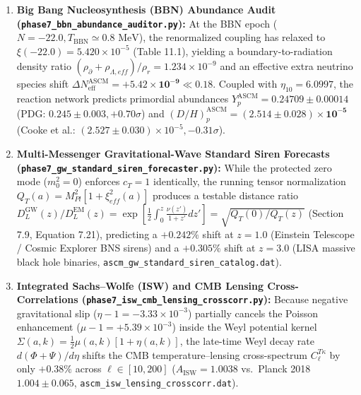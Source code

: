 \documentclass[aps,prd,onecolumn,superscriptaddress,nofootinbib,longbibliography,10pt]{revtex4-2}
\begin{document}
\begin{enumerate}
  
\item \textbf{Big Bang Nucleosynthesis (BBN) Abundance Audit (\texttt{phase7_bbn_abundance_auditor.py}):} At the BBN epoch (\(N = -22.0, T_{\mathrm{BBN}} \simeq 0.8\text{ MeV}\)), the renormalized coupling has relaxed to \(\xi(-22.0) = 5.420 \times 10^{-5}\) (Table 11.1), yielding a boundary-to-radiation density ratio \((\rho_{\partial} + \rho_{\Lambda,eff})/\rho_r = 1.234 \times 10^{-9}\) and an effective extra neutrino species shift \(\Delta N_{\mathrm{eff}}^{\mathrm{ASCM}} = \mathbf{+5.42 \times 10^{-9}} \ll 0.18\). Coupled with \(\eta_{10} = 6.0997\), the reaction network predicts primordial abundances \(Y_p^{\mathrm{ASCM}} = \mathbf{0.24709 \pm 0.00014}\) (PDG: \(0.245 \pm 0.003, +0.70\sigma\)) and \((D/H)_p^{\mathrm{ASCM}} = \mathbf{(2.514 \pm 0.028) \times 10^{-5}}\) (Cooke et al.: \((2.527 \pm 0.030) \times 10^{-5}, -0.31\sigma\)).
  
\item \textbf{Multi-Messenger Gravitational-Wave Standard Siren Forecasts (\texttt{phase7_gw_standard_siren_forecaster.py}):} While the protected zero mode (\(m_0^2 = 0\)) enforces \(c_T = 1\) identically, the running tensor normalization \(Q_T(a) = M_{Pl}^2[1 + \xi_{eff}^2(a)]\) produces a testable distance ratio \(D_L^{\mathrm{GW}}(z)/D_L^{\mathrm{EM}}(z) = \exp\left[\frac{1}{2}\int_0^z \frac{\nu(z')}{1+z'}dz'\right] = \sqrt{Q_T(0)/Q_T(z)}\) (Section 7.9, Equation 7.21), predicting a \(+0.242\%\) shift at \(z = 1.0\) (Einstein Telescope / Cosmic Explorer BNS sirens) and a \(+0.305\%\) shift at \(z = 3.0\) (LISA massive black hole binaries, \texttt{ascm_gw_standard_siren_catalog.dat}).
  
\item \textbf{Integrated Sachs–Wolfe (ISW) and CMB Lensing Cross-Correlations (\texttt{phase7_isw_cmb_lensing_crosscorr.py}):} Because negative gravitational slip (\(\eta - 1 = -3.33 \times 10^{-3}\)) partially cancels the Poisson enhancement (\(\mu - 1 = +5.39 \times 10^{-3}\)) inside the Weyl potential kernel \(\Sigma(a,k) = \frac{1}{2}\mu(a,k)[1 + \eta(a,k)]\), the late-time Weyl decay rate \(d(\Phi+\Psi)/d\eta\) shifts the CMB temperature–lensing cross-spectrum \(C_\ell^{T\kappa}\) by only \(+0.38\%\) across \(\ell \in [10, 200]\) (\(A_{\mathrm{ISW}} = 1.0038\) vs.\ Planck 2018 \(1.004 \pm 0.065\), \texttt{ascm_isw_lensing_crosscorr.dat}).
  

\end{enumerate}
\end{document}
